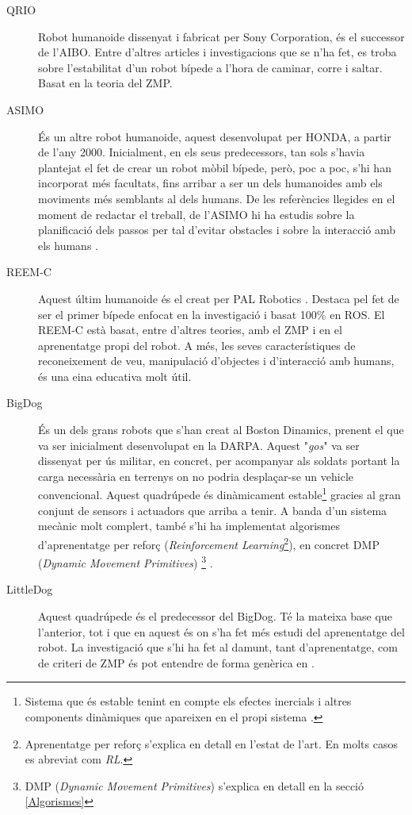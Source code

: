 \documentclass[12pt,a4paper,final,twoside]{article}
\begin{document}
\begin{description}

\item[QRIO] Robot humanoide dissenyat i fabricat per Sony Corporation, és el successor de l'AIBO. Entre d'altres articles i investigacions que se n'ha fet, es troba \cite{Nagasaka2004} sobre l'estabilitat d'un robot bípede a l'hora de caminar, corre i saltar. Basat en la teoria del ZMP.

\item[ASIMO] És un altre robot humanoide, aquest desenvolupat per HONDA, a partir de l'any 2000. Inicialment, en els seus predecessors, tan sols s'havia plantejat el fet de crear un robot mòbil bípede, però, poc a poc, s'hi han incorporat més facultats, fins arribar a ser un dels humanoides amb els moviments més semblants al dels humans\cite{ASIMO_History}. De les referències llegides en el moment de redactar el treball, de l'ASIMO hi ha estudis sobre la planificació dels passos per tal d'evitar obstacles \cite{Chestnutt2005} i sobre la interacció amb els humans \cite{Mutlu2006}.

\item[REEM-C] Aquest últim humanoide és el creat per PAL Robotics \cite{REEM_C}. Destaca pel fet de ser el primer bípede enfocat en la investigació i basat 100\% en ROS. El REEM-C està basat, entre d'altres teories, amb el ZMP i en el aprenentatge propi del robot. A més, les seves característiques de reconeixement de veu, manipulació d'objectes i d'interacció amb humans, és una eina educativa molt útil. \cite{Robotics}

\item[BigDog] És un dels grans robots que s'han creat al Boston Dinamics, prenent el que va ser inicialment desenvolupat en la DARPA\cite{Marc2008}. Aquest "\textit{gos}" va ser dissenyat per ús militar, en concret, per acompanyar als soldats portant la carga necessària en terrenys on no podria desplaçar-se un vehicle convencional. Aquest quadrúpede és dinàmicament estable\footnote{Sistema que és estable tenint en compte els efectes inercials i altres components dinàmiques que apareixen en el propi sistema \cite{Purushotham2009}.} gracies al gran conjunt de sensors i actuadors que arriba a tenir. A banda d'un sistema mecànic molt complert, també s'hi ha implementat algorismes d'aprenentatge per reforç (\textit{Reinforcement Learning}\footnote{Aprenentatge per reforç s'explica en detall en l'estat de l'art. En molts casos es abreviat com \textit{RL}.}), en concret DMP (\textit{Dynamic Movement Primitives}) \footnote{DMP (\textit{Dynamic Movement Primitives}) s'explica en detall en la secció \ref{Algorismes} } \cite{Playter2006}.

\item[LittleDog] Aquest quadrúpede és el predecessor del BigDog. Té la mateixa base que l'anterior, tot i que en aquest és on s'ha fet més estudi del aprenentatge del robot. La investigació que s'hi ha fet al damunt, tant d'aprenentatge, com de criteri de ZMP és pot entendre de forma genèrica en \cite{Kalakrishnan2010}. 

\end{description}
\end{document}
